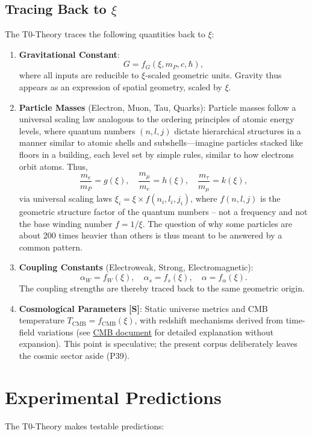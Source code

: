 	\subsection{Tracing Back to $\xi$}
	The T0-Theory traces the following quantities back to $\xi$:
	\begin{enumerate}
		\item \textbf{Gravitational Constant}:
		\[
		G = f_G(\xi, m_P, c, \hbar),
		\]
		where all inputs are reducible to $\xi$-scaled geometric units. Gravity thus appears as an expression of spatial geometry, scaled by $\xi$.
		
		\item \textbf{Particle Masses} (Electron, Muon, Tau, Quarks):
		Particle masses follow a universal scaling law analogous to the ordering principles of atomic energy levels, where quantum numbers $(n, l, j)$ dictate hierarchical structures in a manner similar to atomic shells and subshells—imagine particles stacked like floors in a building, each level set by simple rules, similar to how electrons orbit atoms. Thus,
		\[
		\frac{m_e}{m_P} = g(\xi), \quad \frac{m_\mu}{m_e} = h(\xi), \quad \frac{m_\tau}{m_\mu} = k(\xi),
		\]
		via universal scaling laws $\xi_i = \xi \times f(n_i, l_i, j_i)$, where $f(n,l,j)$ is the geometric structure factor of the quantum numbers -- not a frequency and not the base winding number $f = 1/\xi$. The question of why some particles are about 200 times heavier than others is thus meant to be answered by a common pattern.
		
		\item \textbf{Coupling Constants} (Electroweak, Strong, Electromagnetic):
		\[
		\alpha_W = f_W(\xi), \quad \alpha_s = f_s(\xi), \quad \alpha = f_\alpha(\xi).
		\]
		The coupling strengths are thereby traced back to the same geometric origin.
		
		\item \textbf{Cosmological Parameters} \textbf{[S]}:
		Static universe metrics and CMB temperature $T_{\text{CMB}} = f_{\text{CMB}}(\xi)$, with redshift mechanisms derived from time-field variations (see \href{https://github.com/jpascher/T0-Time-Mass-Duality/blob/main/2/pdf/140_T0_CMB_Donoghue_Analyse_En.pdf}{CMB document} for detailed explanation without expansion). This point is speculative; the present corpus deliberately leaves the cosmic sector aside (P39).
	\end{enumerate}

	\section{Experimental Predictions}
	The T0-Theory makes testable predictions:
	
